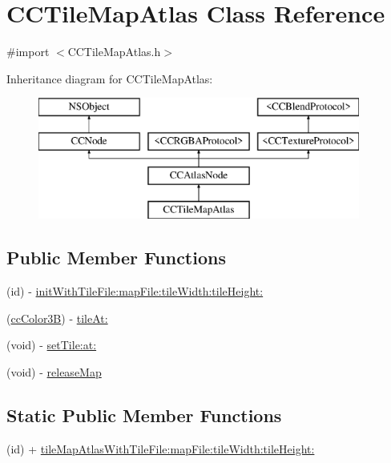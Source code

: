 \hypertarget{interface_c_c_tile_map_atlas}{\section{C\-C\-Tile\-Map\-Atlas Class Reference}
\label{interface_c_c_tile_map_atlas}
}


{\ttfamily \#import $<$C\-C\-Tile\-Map\-Atlas.\-h$>$}

Inheritance diagram for C\-C\-Tile\-Map\-Atlas\-:\begin{figure}[H]
\begin{center}
\leavevmode
\includegraphics[height=4.000000cm]{interface_c_c_tile_map_atlas}
\end{center}
\end{figure}
\subsection*{Public Member Functions}
\begin{DoxyCompactItemize}
\item 
(id) -\/ \hyperlink{interface_c_c_tile_map_atlas_a8023c0c1b472774619a6b98ea5907e11}{init\-With\-Tile\-File\-:map\-File\-:tile\-Width\-:tile\-Height\-:}
\item 
(\hyperlink{cc_types_8h_a829b00c53e72f0115e3880cb508fec1e}{cc\-Color3\-B}) -\/ \hyperlink{interface_c_c_tile_map_atlas_a7db2220cb9a025ea59d4948af4f440d2}{tile\-At\-:}
\item 
(void) -\/ \hyperlink{interface_c_c_tile_map_atlas_a2883326f3407068ac464a42efe86f404}{set\-Tile\-:at\-:}
\item 
(void) -\/ \hyperlink{interface_c_c_tile_map_atlas_ace2d60774d98bc68e986a40aa52e459a}{release\-Map}
\end{DoxyCompactItemize}
\subsection*{Static Public Member Functions}
\begin{DoxyCompactItemize}
\item 
(id) + \hyperlink{interface_c_c_tile_map_atlas_a709bbea52bf725c3e19c507f0d0cdb6b}{tile\-Map\-Atlas\-With\-Tile\-File\-:map\-File\-:tile\-Width\-:tile\-Height\-:}
\end{DoxyCompactItemize}
